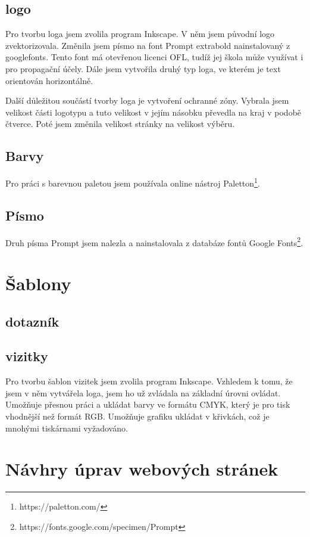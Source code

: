 \documentclass[11pt,a4paper,twoside,openright]{report}
\begin{document}
\subsection{logo}
Pro tvorbu loga jsem zvolila program Inkscape. V něm jsem původní logo zvektorizovala. Změnila jsem písmo na font Prompt extrabold nainstalovaný z googlefonts. Tento font má otevřenou licenci OFL, tudíž jej škola může využívat i pro propagační účely.
Dále jsem vytvořila druhý typ loga, ve kterém je text orientován horizontálně.

Další důležitou součástí tvorby loga je vytvoření ochranné zóny. Vybrala jsem velikost části logotypu a tuto velikost v jejím násobku převedla na kraj v podobě čtverce. Poté jsem změnila velikost stránky na velikost výběru.

\subsection{Barvy}
Pro práci s barevnou paletou jsem používala online nástroj Paletton\footnote{https://paletton.com/}.

\subsection{Písmo}
Druh písma Prompt jsem nalezla a nainstalovala z databáze fontů Google Fonts\footnote{https://fonts.google.com/specimen/Prompt}.

\section{Šablony}
\subsection{dotazník}
\subsection{vizitky}
Pro tvorbu šablon vizitek jsem zvolila program Inkscape. Vzhledem k tomu, že jsem v něm vytvářela loga, jsem ho už zvládala na základní úrovni ovládat. Umožňuje přesnou práci a ukládat barvy ve formátu CMYK, který je pro tisk vhodnější než formát RGB. Umožňuje grafiku ukládat v křivkách, což je mnohými tiskárnami vyžadováno.


\section{Návhry úprav webových stránek}
\end{document}
